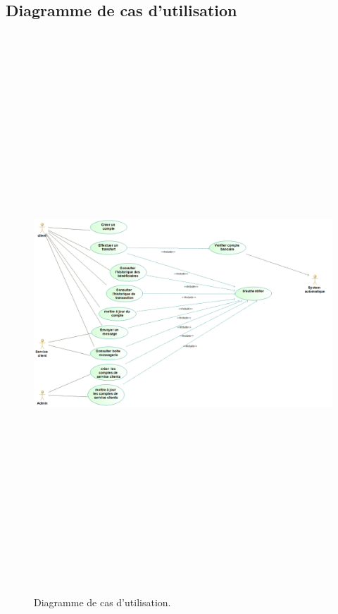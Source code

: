 \newpage
\subsection{Diagramme de cas d’utilisation}
\begin{figure}[h!]
	\includegraphics[width=18cm, height=21cm]{./Template LaTeX/Images/use_case.png}
	\caption{Diagramme de cas d’utilisation.}
	\label{fig1:use_case}
	
	
\end{figure}
\newpage
